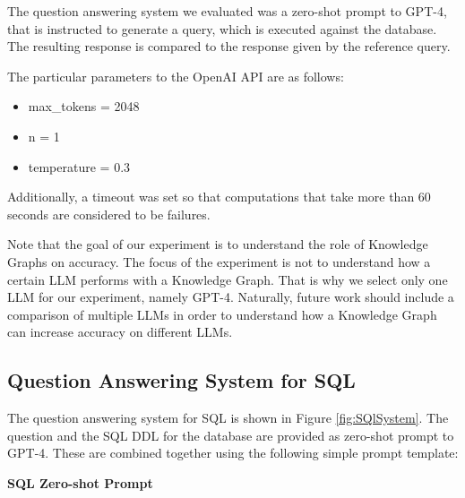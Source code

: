 \documentclass[11pt]{article}
\begin{document}
The question answering system we evaluated was a zero-shot prompt to GPT-4, 
that is instructed to generate a query, which is executed against the database.  
The resulting response is compared to the response given by the reference query. 

The particular parameters to the OpenAI API are as follows: 
\begin{itemize}
    \item max\_tokens = 2048
    \item n = 1
    \item temperature = 0.3
\end{itemize}

Additionally, a timeout was set so that computations that take more than 60 seconds are considered to be failures.

Note that the goal of our experiment is to understand the role of Knowledge Graphs on accuracy.
The focus of the experiment is not to understand how a certain LLM performs with a Knowledge Graph. 
That is why we select only one LLM for our experiment, namely GPT-4. 
Naturally, future work should include a comparison of multiple LLMs in order to understand how a Knowledge Graph can increase accuracy on different LLMs. 


\subsection{Question Answering System for SQL}
The question answering system for SQL is shown in Figure \ref{fig:SQlSystem}.  
The question and the SQL DDL for the database are provided as zero-shot prompt to GPT-4. 
These are combined together using the following simple prompt template:




\noindent \textbf{SQL Zero-shot Prompt}

\end{document}
